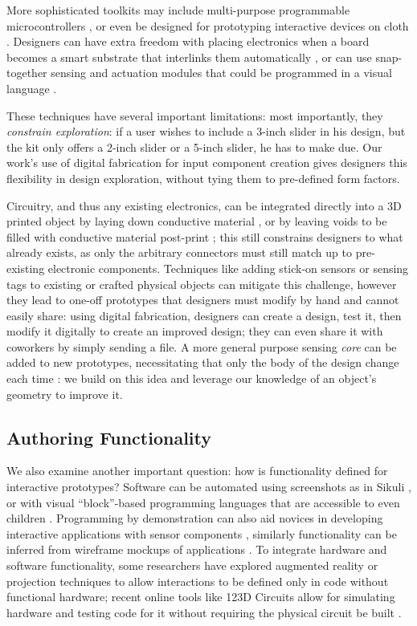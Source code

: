     More sophisticated toolkits may include multi-purpose programmable microcontrollers \cite{arduino}, or even be designed for prototyping interactive devices on cloth \cite{buechley-lilypad}. Designers can have extra freedom with placing electronics when a board becomes a smart substrate that interlinks them automatically \cite{villar-voodooio}, or can use snap-together sensing and actuation modules \cite{avrahami-switcharoo, greenberg-phidgets, lee-calder} that could be programmed in a visual language \cite{villar-gadgeteer}.
    
    These techniques have several important limitations: most importantly, they \emph{constrain exploration}: if a user wishes to include a 3-inch slider in his design, but the kit only offers a 2-inch slider or a 5-inch slider, he has to make due. Our work's use of digital fabrication for input component creation gives designers this flexibility in design exploration, without tying them to pre-defined form factors.

    Circuitry, and thus any existing electronics, can be integrated directly into a 3D printed object by laying down conductive material \cite{sells-reprap,voxel8,sarik-tracebrush}, or by leaving voids to be filled with conductive material post-print \cite{savage-sot}; this still constrains designers to what already exists, as only the arbitrary connectors must still match up to pre-existing electronic components. Techniques like adding stick-on sensors or sensing tags to existing or crafted physical objects \cite{maynes-aminzade-eyepatch,yeo-stickear} can mitigate this challenge, however they lead to one-off prototypes that designers must modify by hand and cannot easily share: using digital fabrication, designers can create a design, test it, then modify it digitally to create an improved design; they can even share it with coworkers by simply sending a file. A more general purpose sensing \emph{core} can be added to new prototypes, necessitating that only the body of the design change each time \cite{doering-composition}: we build on this idea and leverage our knowledge of an object's geometry to improve it.

    \subsection{Authoring Functionality}
    We also examine another important question: how is functionality defined for interactive prototypes? Software can be automated using screenshots as in Sikuli \cite{yeh-sikuli}, or with visual ``block''-based programming languages that are accessible to even children \cite{resnick-scratch}. Programming by demonstration can also aid novices in developing interactive applications with sensor components \cite{hartmann-dtools}, similarly functionality can be inferred from wireframe mockups of applications \cite{li-framewire}. To integrate hardware and software functionality, some researchers have explored augmented reality \cite{nam-AR} or projection \cite{akaoka-displayobjects} techniques to allow interactions to be defined only in code without functional hardware; recent online tools like 123D Circuits allow for simulating hardware and testing code for it without requiring the physical circuit be built \cite{123dcircuits}.

